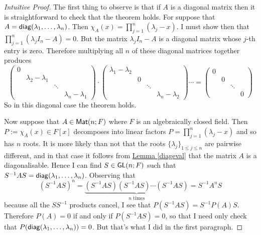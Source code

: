 \documentclass[11pt]{amsbook}
\theoremstyle{definition}
\begin{document}
\begin{proof}[Intuitive Proof] The first thing to observe is that if $A$ is a diagonal matrix then it is straightforward to check that the theorem holds. For suppose that $A = {\sf diag} (\lambda_1, \ldots , \lambda_n)$. Then $\chi_A(x) = \prod_{j=1}^n (\lambda_j - x)$. I must show then that $\prod_{j=1}^n ( \lambda_j I_n - A ) = 0$. But the matrix $\lambda_j I_n - A$ is a diagonal matrix whose $j$-th entry is zero. Therefore multiplying all $n$ of these diagonal matrices together produces $$ \begin{pmatrix} 0 & & &  \\ & \lambda_2 -\lambda_1 & &  \\ & & \ddots &  \\ &&& \lambda_n-\lambda_1  \end{pmatrix} \cdot \begin{pmatrix} \lambda_1 - \lambda_2 & & &  \\ & 0 & &  \\ & & \ddots &  \\ &&& \lambda_n - \lambda_2  \end{pmatrix}  \cdots = \begin{pmatrix} 0 & & &  \\ & 0 & &  \\ & & \ddots &  \\ &&&0  \end{pmatrix} $$ So in this diagonal case the theorem holds.

Now suppose that $A\in {\sf Mat}(n;F)$ where $F$ is an algebraically closed field. Then $P:= \chi_A(x)\in F[x]$ decomposes into linear factors $P = \prod_{j=1}^n (\lambda_j - x)$ and so has $n$ roots. It is more likely than not that the roots $\{ \lambda_j\}_{1\leqslant j \leqslant n}$ are pairwise different, and in that case it follows from \hyperref[diageval]{Lemma \ref{diageval}} that the matrix $A$ is a diagonalisable. Hence I can find $S\in {\sf GL}(n;F)$ such that $S^{-1}AS = {\sf diag}(\lambda_1, \ldots , \lambda_n)$. Observing that $$(S^{-1}AS)^n = \underbrace{(S^{-1}AS)(S^{-1}AS) \cdots (S^{-1}AS)}_{n\text{ times}} = S^{-1} A^n S$$ because all the $SS^{-1}$ products cancel, I see that $P(S^{-1}AS) = S^{-1}P(A) S$. Therefore $P(A) = 0$ if and only if $P(S^{-1}AS) = 0$, so that I need only check that $P({\sf diag}(\lambda_1, \ldots , \lambda_n)) = 0$. But that's what I did in the first paragraph.
\end{proof}
\end{document}
